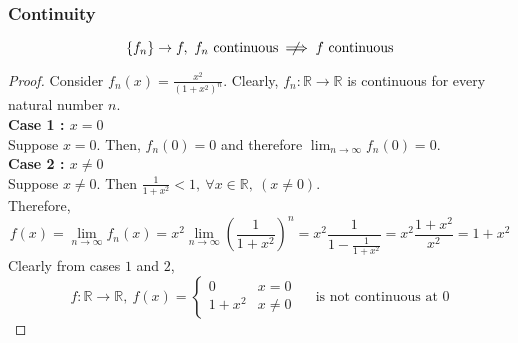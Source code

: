 \subsubsection{Continuity}
\[ \left\{f_n\right\} \to f,\ f_n \text{ continuous } \;\not\nobreak\!\!\!\!\implies f \text{ continuous} \]
\begin{proof}
Consider $f_n(x) = \frac{x^2}{(1+x^2)^n}$.
	Clearly, $f_n : \mathbb{R} \to \mathbb{R}$ is continuous for every natural number $n$.\\

\textbf{Case 1 : $x = 0$}\\
Suppose $x = 0$.
Then, $f_n(0) = 0$ and therefore $\displaystyle\lim_{n \to \infty} f_n(0) = 0$. \\

\textbf{Case 2 : $x \ne 0$}\\
	Suppose $x \ne 0$.
	Then $\frac{1}{1+x^2} < 1,\ \forall x \in \mathbb{R},\ (x \ne 0)$.\\
Therefore,
\[ f(x) = \lim_{n \to \infty} f_n(x) = x^2 \lim_{n \to \infty} \left(\frac{1}{1+x^2}\right)^n = x^2 \frac{1}{1-\frac{1}{1+x^2}} = x^2 \frac{1+x^2}{x^2} = 1+x^2 \]
	Clearly from cases $1$ and $2$,\\
	\[ f : \mathbb{R} \to \mathbb{R},\ f(x)= \begin{cases} 0 & x = 0 \\ 1+x^2 & x \ne 0 \end{cases} \quad \text{ is not continuous at } 0 \]
\end{proof}
